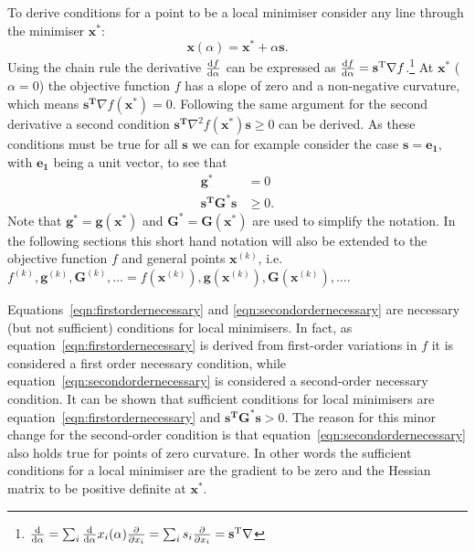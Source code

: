To derive conditions for a point to be a local minimiser consider any line
through the minimiser $\mathbf{x^*}$:
%
\begin{equation}
    \mathbf{x}(\alpha)=\mathbf{x^*}+\alpha\mathbf{s}.
\end{equation}
%
Using the chain rule the derivative $\dv{f}{\alpha}$ can be expressed as
$\dv{f}{\alpha}=\mathbf{s^\text{T}}\nabla
f$.\footnote{$\dv{\alpha}=\sum_i\dv{\alpha}x_i(\alpha)\pdv{x_i}=\sum_i
s_i\pdv{x_i}=\mathbf{s^\text{T}}\nabla$} At $\mathbf{x^*}$ ($\alpha=0$) the
objective function $f$ has a slope of zero and a non-negative curvature, which
means $\mathbf{s^\text{T}}\nabla f(\mathbf{x^*})=0$. Following the same
argument for the second derivative a second condition
$\mathbf{s^\text{T}}\nabla^2 f(\mathbf{x^*})\mathbf{s}\geq 0$ can be derived.
As these conditions must be true for all $\mathbf{s}$ we can for example
consider the case $\mathbf{s}=\mathbf{e_1}$, with $\mathbf{e_1}$ being a unit
vector, to see that
%
\begin{align}
    \mathbf{g^*}&=0\label{eqn:firstordernecessary}\\
    \mathbf{s^\text{T}}\mathbf{G^*}\mathbf{s}&\geq 0.\label{eqn:secondordernecessary}
\end{align}
%
Note that $\mathbf{g^*}=\mathbf{g}(\mathbf{x^*})$ and
$\mathbf{G^*}=\mathbf{G}(\mathbf{x^*})$ are used to simplify the notation. In
the following sections this short hand notation will also be extended to the
objective function $f$ and general points $\mathbf{x}^{(k)}$, i.e.
$f^{(k)},\mathbf{g}^{(k)},\mathbf{G}^{(k)},\dots=f\left(\mathbf{x}^{(k)}\right),\mathbf{g}\left(\mathbf{x}^{(k)}\right),\mathbf{G}\left(\mathbf{x}^{(k)}\right),\dots$.

Equations~\eqref{eqn:firstordernecessary} and \eqref{eqn:secondordernecessary}
are necessary (but not sufficient) conditions for local minimisers. In fact, as
equation~\eqref{eqn:firstordernecessary} is derived from first-order variations
in $f$ it is considered a first order necessary condition, while
equation~\eqref{eqn:secondordernecessary} is considered a second-order
necessary condition. It can be shown that sufficient conditions for local
minimisers are equation~\eqref{eqn:firstordernecessary} and
$\mathbf{s^\text{T}}\mathbf{G^*}\mathbf{s}>
0$.\autocite{Fletcher_Practicalmethodsoptimization_1987} The reason for this
minor change for the second-order condition is that
equation~\eqref{eqn:secondordernecessary} also holds true for points of zero
curvature. In other words the sufficient conditions for a local minimiser are
the gradient to be zero and the Hessian matrix to be positive definite at
$\mathbf{x^*}$.

